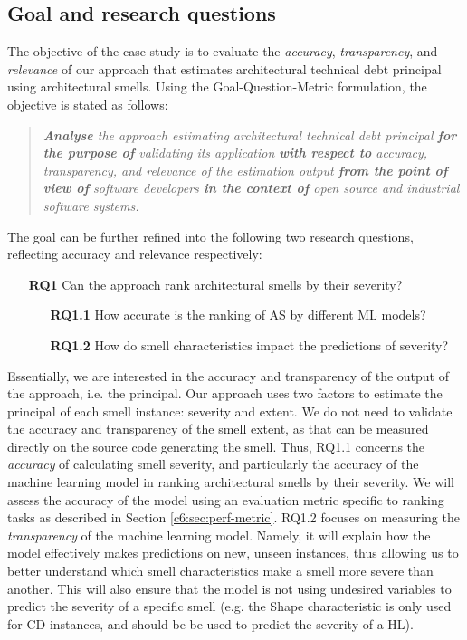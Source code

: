 
\subsection{Goal and research questions}\label{c6:sec:goal-and-rqs}
The objective of the case study is to evaluate the \emph{accuracy}, \emph{transparency}, and \emph{relevance} of our approach that estimates architectural technical debt principal using architectural smells.
Using the Goal-Question-Metric \cite{VanSolingen2002} formulation, the objective is stated as follows:
\begin{quote}
    \itshape
    \textbf{Analyse} the approach estimating architectural technical debt principal \textbf{for the purpose of} validating its application \textbf{with respect to} accuracy, transparency, and relevance of the estimation output \textbf{from the point of view of} software developers \textbf{in the context of} open source and industrial software systems.
\end{quote}
The goal can be further refined into the following two research questions, reflecting accuracy and relevance respectively:
\begin{itemize}
    \item[\textbf{RQ1}] Can the approach rank architectural smells by their severity?
    \begin{itemize}
        \item[\textbf{RQ1.1}] How accurate is the ranking of AS by different ML models?
        \item[\textbf{RQ1.2}] How do smell characteristics impact the predictions of severity?
    \end{itemize}
\end{itemize}
Essentially, we are interested in the accuracy and transparency of the output of the approach, i.e. the principal. Our approach uses two factors to estimate the principal of each smell instance: severity and extent. We do not need to validate the accuracy and transparency of the smell extent, as that can be measured directly on the source code generating the smell. 
Thus, RQ1.1 concerns the \emph{accuracy} of calculating smell severity, and particularly the accuracy of the machine learning model in ranking architectural smells by their severity.
We will assess the accuracy of the model using an evaluation metric specific to ranking tasks as described in Section \ref{c6:sec:perf-metric}.
RQ1.2 focuses on measuring the \emph{transparency} of the machine learning model. Namely, it will explain how the model effectively makes predictions on new, unseen instances, thus allowing us to better understand which smell characteristics make a smell more severe than another.
This will also ensure that the model is not using undesired variables to predict the severity of a specific smell (e.g. the Shape characteristic is only used for CD instances, and should be be used to predict the severity of a HL).

